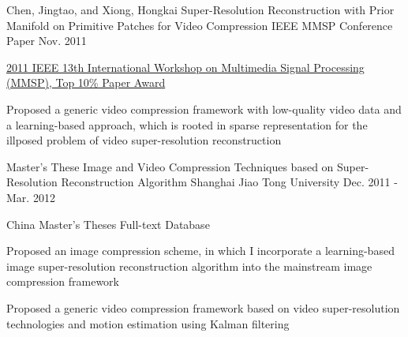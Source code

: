 

\begin{cventries}

  \cventry
    {Chen, Jingtao, and  Xiong, Hongkai} %
    {Super-Resolution Reconstruction with Prior Manifold on Primitive Patches for Video Compression} %
    {IEEE MMSP Conference Paper} %
    {Nov. 2011} %
    {
      \begin{cvitems} %
        \item {\href{http://ieeexplore.ieee.org/abstract/document/6093849/}{2011 IEEE 13th International Workshop on Multimedia Signal Processing (MMSP), Top 10\% Paper Award}}
        \item {Proposed a generic video compression framework with low-quality video data and a learning-based approach, which is rooted in sparse representation for the illposed problem of video super-resolution reconstruction}
      \end{cvitems}
    }

  \cventry
    {Master's These} %
    {Image and Video Compression Techniques based on Super-Resolution Reconstruction Algorithm} %
    {Shanghai Jiao Tong University} %
    {Dec. 2011 - Mar. 2012} %
    {
      \begin{cvitems} %
        \item {China Master’s Theses Full-text Database}
		\item {Proposed an image compression scheme, in which I incorporate a learning-based image super-resolution
reconstruction algorithm into the mainstream image compression framework}
		\item {Proposed a generic video compression framework based on video super-resolution technologies and motion estimation using Kalman filtering}
      \end{cvitems}
    }

\end{cventries}
